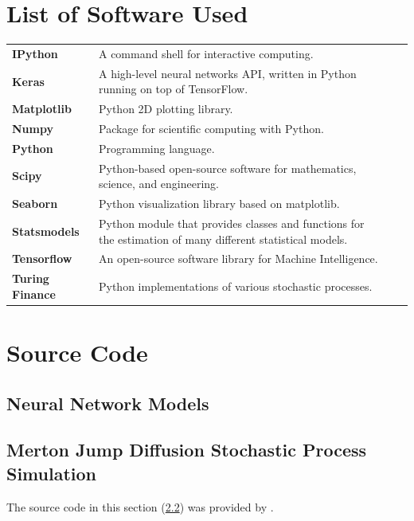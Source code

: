 \documentclass[11pt,oneside,openany,a4paper,english, report, goldenblock
]{usthesis}
\begin{document}
\chapter[Appendix A]{List of Software Used}
\label{list_of_software_used}
\def\arraystretch{2}
\begin{tabular}[h]{l p{9cm} ll}
	
	\textbf{IPython} & A command shell for interactive computing. &\cite{ipython} \\ 
	
	\textbf{Keras} & A high-level neural networks API, written in Python running on top of TensorFlow. &\cite{chollet2015keras} \\ 
	
	\textbf{Matplotlib} & Python 2D plotting library. &\cite{matplotlib} \\ 
	
	\textbf{Numpy} & Package for scientific computing with Python. &\cite{numpy} \\ 
	
	\textbf{Python} & Programming language. & \cite{python} \\ 
	
	\textbf{Scipy} & Python-based open-source software for mathematics, science, and engineering. &\cite{scipy} \\ 
	
	\textbf{Seaborn} & Python visualization library based on matplotlib. &\cite{seaborn} \\ 
	
	\textbf{Statsmodels} & Python module that provides classes and functions for the estimation of many different statistical models. &\cite{statsmodels} \\ 
	
	\textbf{Tensorflow} & An open-source software library for Machine Intelligence. & \cite{tensorflow2015-whitepaper} \\ 
	
	\textbf{Turing Finance} & Python implementations of various stochastic processes. & \cite{reid} \\ 
	 
\end{tabular} 

\chapter[Appendix B]{Source Code}
\label{appedix:source_code}

\section{Neural Network Models}


\newpage
\section{Merton Jump Diffusion Stochastic Process Simulation}
\label{appendix:source_code:merton_simulation}
The source code in this section (\ref{appendix:source_code:merton_simulation}) was provided by \cite{reid}.

\end{document}
